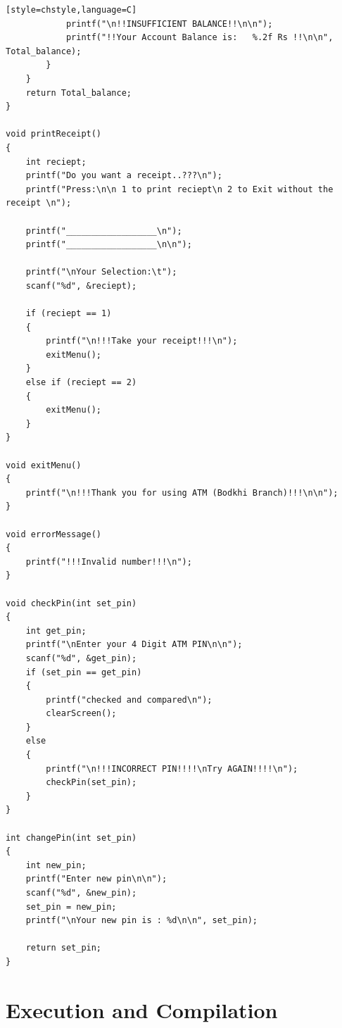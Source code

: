 \documentclass{article}
\begin{document}
\begin{verbatim}[style=chstyle,language=C]
            printf("\n!!INSUFFICIENT BALANCE!!\n\n");
            printf("!!Your Account Balance is:   %.2f Rs !!\n\n", Total_balance);
        }
    }
    return Total_balance;
}

void printReceipt()
{
    int reciept;
    printf("Do you want a receipt..???\n");
    printf("Press:\n\n 1 to print reciept\n 2 to Exit without the receipt \n");

    printf("__________________\n");
    printf("__________________\n\n");

    printf("\nYour Selection:\t");
    scanf("%d", &reciept);

    if (reciept == 1)
    {
        printf("\n!!!Take your receipt!!!\n");
        exitMenu();
    }
    else if (reciept == 2)
    {
        exitMenu();
    }
}

void exitMenu()
{
    printf("\n!!!Thank you for using ATM (Bodkhi Branch)!!!\n\n");
}

void errorMessage()
{
    printf("!!!Invalid number!!!\n");
}

void checkPin(int set_pin)
{
    int get_pin;
    printf("\nEnter your 4 Digit ATM PIN\n\n");
    scanf("%d", &get_pin);
    if (set_pin == get_pin)
    {
        printf("checked and compared\n");
        clearScreen();
    }
    else
    {
        printf("\n!!!INCORRECT PIN!!!!\nTry AGAIN!!!!\n");
        checkPin(set_pin);
    }
}

int changePin(int set_pin)
{
    int new_pin;
    printf("Enter new pin\n\n");
    scanf("%d", &new_pin);
    set_pin = new_pin;
    printf("\nYour new pin is : %d\n\n", set_pin);

    return set_pin;
}
\end{verbatim}

\section{Execution and Compilation}
\end{document}
